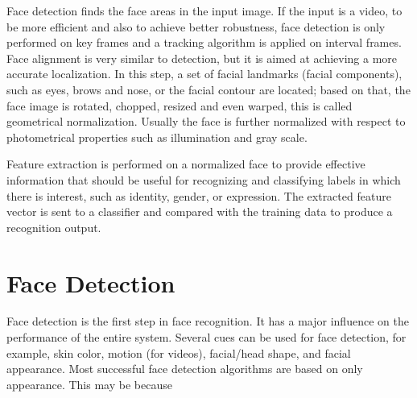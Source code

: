 \documentclass[12pt, twoside]{report}
\begin{document}
	Face detection finds the face areas in the input image. If the input is a video, to be more efficient and also to achieve better robustness, face detection is only performed on key frames and a tracking algorithm is applied on interval frames. Face alignment is very similar to detection, but it is aimed at achieving a more accurate localization. In this step, a set of facial landmarks (facial components), such as eyes, brows and nose, or the facial contour are located; based on that, the face image is rotated, chopped, resized and even warped, this is called geometrical normalization. Usually the face is further normalized with respect to photometrical properties such as illumination and gray scale.

	Feature extraction is performed on a normalized face to provide effective information that should be useful for recognizing and classifying labels in which there is interest, such as identity, gender, or expression. The extracted feature vector is sent to a classifier and compared with the training data to produce a recognition output.

	\section{Face Detection}
	Face detection is the first step in face recognition. It has a major influence on the performance of the entire system. Several cues can be used for face detection, for example, skin color, motion (for videos), facial/head shape, and facial appearance. Most successful face detection algorithms are based on only appearance. This may be because

\end{document}
